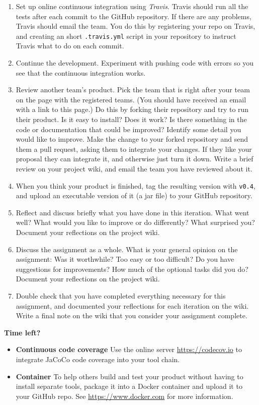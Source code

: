 \documentclass[swedish,english]{article}
\begin{document}
\begin{enumerate}
\item Set up online continuous integration using \emph{Travis}. Travis should run all the tests after each commit to the GitHub repository. If there are any problems, Travis should email the team. You do this by registering your repo on Travis, and creating an short \verb'.travis.yml' script in your repository to instruct Travis what to do on each commit.
\item Continue the development. Experiment with pushing code with errors so you see that the continuous integration works.
\item Review another team's product. Pick the team that is right after your team on the page with the registered teams. (You should have received an email with a link to this page.) Do this by forking their repository and try to run their product. Is it easy to install? Does it work? Is there something in the code or documentation that could be improved? Identify some detail you would like to improve. Make the change to your forked repository and send them a pull request, asking them to integrate your changes. If they like your proposal they can integrate it, and otherwise just turn it down. Write a brief review on your project wiki, and email the team you have reviewed about it.
\item When you think your product is finished, tag the resulting version with \verb'v0.4', and upload an executable version of it (a jar file) to your GitHub repository.
\item Reflect and discuss briefly what you have done in this iteration. What went well? What would you like to improve or do differently? What surprised you? Document your reflections on the project wiki.

\item Discuss the assignment as a whole. What is your general opinion on the assignment: Was it worthwhile? Too easy or too difficult? Do you have suggestions for improvements? How much of the optional tasks did you do? Document your reflections on the project wiki.

\item Double check that you have completed everything necessary for this assignment, and documented your reflections for each iteration on the wiki. Write a final note on the wiki that you consider your assignment complete.

\end{enumerate}

\textbf{Time left?}

\begin{itemize}
\item \textbf{Continuous code coverage} Use the online server \url{https://codecov.io} to integrate JaCoCo code coverage into your tool chain.
\item \textbf{Container} To help others build and test your product without having to install separate tools, package it into a Docker container and upload it to your GitHub repo. See \url{https://www.docker.com} for more information.
\end{itemize}
 
\end{document}
